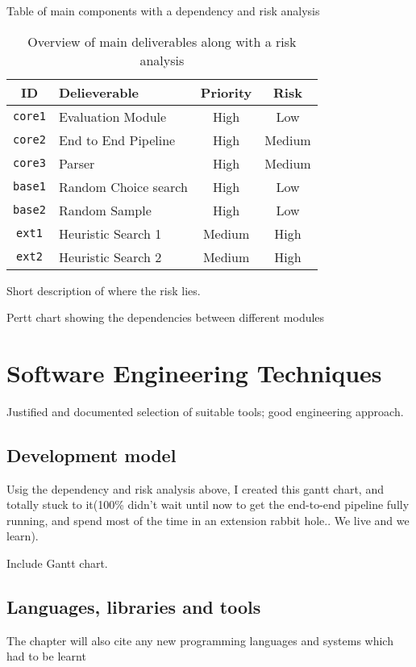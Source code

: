 \documentclass[12pt,a4paper,twoside,openright]{report}
\begin{document}
Table of main components with a dependency and risk analysis 

\begin{table}[ht]
  \caption{Overview of main deliverables along with a risk analysis}
  \label{requirements}
  \begin{tabularx}{\textwidth}{cXcc}
    ID & Delieverable & Priority & Risk \\
    \toprule
    \texttt{core1} & Evaluation Module & High & Low \\
    \texttt{core2} & End to End Pipeline  & High & Medium \\
    \texttt{core3} & Parser  & High & Medium \\
    \texttt{base1} & Random Choice search & High & Low \\
    \texttt{base2} & Random Sample & High & Low \\
    \texttt{ext1} & Heuristic Search 1 & Medium & High \\
    \texttt{ext2} & Heuristic Search 2 & Medium & High \\
  \end{tabularx}
\end{table}
\par
Short description of where the risk lies. 
\par
Pertt chart showing the dependencies between different modules


\section{Software Engineering Techniques}
Justified and documented selection of suitable tools; good engineering approach.


\subsection{Development model}

Usig the dependency and risk analysis above, I created this gantt chart, and totally stuck to it(100\% didn't wait until now to get the end-to-end pipeline fully running, and spend most of the time in an extension rabbit hole.. We live and we learn).

Include Gantt chart.

\subsection{Languages, libraries and tools}
The chapter will also cite any new programming languages and systems which had to be learnt 
\end{document}
